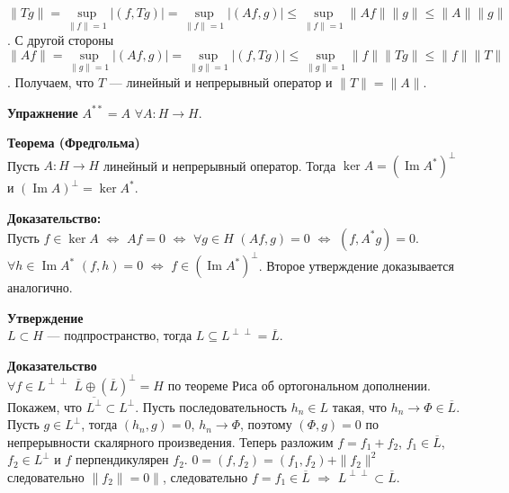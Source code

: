 \documentclass[12pt]{article}
\DeclareMathOperator{\Imm}{Im}
\begin{document}
$\|Tg\| = \sup\limits_{\|f\| = 1}|(f, Tg)| = \sup\limits_{\|f\| = 1}|(Af, g)| \le \sup\limits_{\|f\| = 1}\|Af\|\|g\| \le \|A\|\|g\|$.
С другой стороны $\|Af\| = \sup\limits_{\|g\| = 1}|(Af, g)| = \sup\limits_{\|g\| = 1}|(f, Tg)| \le \sup\limits_{\|g\| = 1} \|f\| \|Tg\| \le \|f\| \|T\|$.
Получаем, что $T$ --- линейный и непрерывный оператор и $\|T\| = \|A\|$.

\textbf{Упражнение} $A^{**} = A$ $\forall A : H \to H$.

\textbf{Теорема (Фредгольма)}\\
Пусть $A : H \to H$ линейный и непрерывный оператор. Тогда $\ker A = (\Imm A^*)^\perp$ и $(\Imm A)^\perp = \ker A^*$.

\textbf{Доказательство:}\\
Пусть $f \in \ker A$ $\Leftrightarrow$ $Af = 0$ $\Leftrightarrow$ $\forall g \in H$ $(Af, g) = 0$ $\Leftrightarrow$ $(f, A^* g) = 0$.
$\forall h \in \Imm A^*$ $(f, h) = 0$ $\Leftrightarrow$ $f \in (\Imm A^*)^\perp$. Второе утверждение доказывается аналогично.

\textbf{Утверждение}\\
$L \subset H$ --- подпространство, тогда $L \subseteq L^{\perp\perp} = \overline{L}$.

\textbf{Доказательство}\\
$\forall f \in L^{\perp\perp}$
$\overline{L} \oplus (\overline{L})^{\perp} = H$ по теореме Риса об ортогональном дополнении.
Покажем, что $\overline{L^{\perp}} \subset L^{\perp}$.
Пусть последовательность $h_n \in L$ такая, что $h_n \to \Phi \in \overline{L}$.
Пусть $g \in L^{\perp}$, тогда $(h_n, g) = 0$, $h_n \to \Phi$, поэтому $(\Phi, g) = 0$ по непрерывности скалярного произведения.
Теперь разложим $f = f_1 + f_2$, $f_1 \in \overline{L}$, $f_2 \in L^{\perp}$ и $f$ перпендикулярен $f_2$.
$0 = (f, f_2) = (f_1, f_2) + \|f_2\|^2$ следовательно $\|f_2\| = 0\|$, следовательно $f = f_1 \in \overline{L}$ $\Rightarrow$ $L^{\perp\perp} \subset \overline{L}$.
\end{document}
